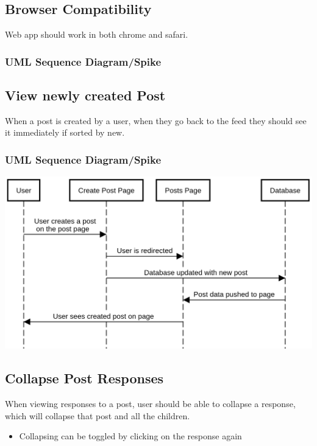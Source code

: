 \documentclass[12pt]{article}
\begin{document}
\subsection{Browser Compatibility}
Web app should work in both chrome and safari.
\subsubsection{UML Sequence Diagram/Spike}

\subsection{View newly created Post}
When a post is created by a user, when they go back to the feed they should see
it immediately if sorted by new.
\subsubsection{UML Sequence Diagram/Spike}
\includegraphics[scale=0.5]{img/view_newly_created_post.png}\linebreak

\subsection{Collapse Post Responses}
When viewing responses to a post, user should be able to collapse a response,
which will collapse that post and all the children.
\begin{itemize}
  \item Collapsing can be toggled by clicking on the response again
\end{itemize}
\end{document}

